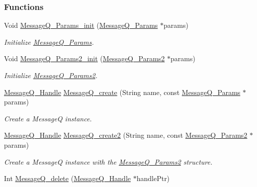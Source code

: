 \subsubsection*{Functions}
\begin{DoxyCompactItemize}
\item 
Void \hyperlink{_message_q_8h_a896b64c7afc22be66f1a6c3aa157537f}{Message\-Q\-\_\-\-Params\-\_\-init} (\hyperlink{struct_message_q___params}{Message\-Q\-\_\-\-Params} $\ast$params)
\begin{DoxyCompactList}\small\item\em Initialize \hyperlink{struct_message_q___params}{Message\-Q\-\_\-\-Params}. \end{DoxyCompactList}\item 
Void \hyperlink{_message_q_8h_a2f7743bad878b04d8448b1141162091f}{Message\-Q\-\_\-\-Params2\-\_\-init} (\hyperlink{struct_message_q___params2}{Message\-Q\-\_\-\-Params2} $\ast$params)
\begin{DoxyCompactList}\small\item\em Initialize \hyperlink{struct_message_q___params2}{Message\-Q\-\_\-\-Params2}. \end{DoxyCompactList}\item 
\hyperlink{_message_q_8h_a1d584ce08733ca864d81e1e64a41cf7a}{Message\-Q\-\_\-\-Handle} \hyperlink{_message_q_8h_a1f2be1c6bf60aa6e220cf5805052f727}{Message\-Q\-\_\-create} (String name, const \hyperlink{struct_message_q___params}{Message\-Q\-\_\-\-Params} $\ast$params)
\begin{DoxyCompactList}\small\item\em Create a Message\-Q instance. \end{DoxyCompactList}\item 
\hyperlink{_message_q_8h_a1d584ce08733ca864d81e1e64a41cf7a}{Message\-Q\-\_\-\-Handle} \hyperlink{_message_q_8h_a7d5165a5c50905f87da2df01a917ea88}{Message\-Q\-\_\-create2} (String name, const \hyperlink{struct_message_q___params2}{Message\-Q\-\_\-\-Params2} $\ast$params)
\begin{DoxyCompactList}\small\item\em Create a Message\-Q instance with the \hyperlink{struct_message_q___params2}{Message\-Q\-\_\-\-Params2} structure. \end{DoxyCompactList}\item 
Int \hyperlink{_message_q_8h_a10986c1a6b64d3ca07c38d1521ea16cd}{Message\-Q\-\_\-delete} (\hyperlink{_message_q_8h_a1d584ce08733ca864d81e1e64a41cf7a}{Message\-Q\-\_\-\-Handle} $\ast$handle\-Ptr)

\end{DoxyCompactItemize}
